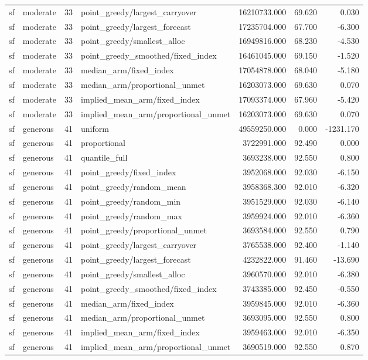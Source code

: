 \begin{tabular}{llrlrrr}
sf & moderate & 33 & point\_greedy/largest\_carryover & 16210733.000 & 69.620 & 0.030 \\
sf & moderate & 33 & point\_greedy/largest\_forecast & 17235704.000 & 67.700 & -6.300 \\
sf & moderate & 33 & point\_greedy/smallest\_alloc & 16949816.000 & 68.230 & -4.530 \\
sf & moderate & 33 & point\_greedy\_smoothed/fixed\_index & 16461045.000 & 69.150 & -1.520 \\
sf & moderate & 33 & median\_arm/fixed\_index & 17054878.000 & 68.040 & -5.180 \\
sf & moderate & 33 & median\_arm/proportional\_unmet & 16203073.000 & 69.630 & 0.070 \\
sf & moderate & 33 & implied\_mean\_arm/fixed\_index & 17093374.000 & 67.960 & -5.420 \\
sf & moderate & 33 & implied\_mean\_arm/proportional\_unmet & 16203073.000 & 69.630 & 0.070 \\
sf & generous & 41 & uniform & 49559250.000 & 0.000 & -1231.170 \\
sf & generous & 41 & proportional & 3722991.000 & 92.490 & 0.000 \\
sf & generous & 41 & quantile\_full & 3693238.000 & 92.550 & 0.800 \\
sf & generous & 41 & point\_greedy/fixed\_index & 3952068.000 & 92.030 & -6.150 \\
sf & generous & 41 & point\_greedy/random\_mean & 3958368.300 & 92.010 & -6.320 \\
sf & generous & 41 & point\_greedy/random\_min & 3951529.000 & 92.030 & -6.140 \\
sf & generous & 41 & point\_greedy/random\_max & 3959924.000 & 92.010 & -6.360 \\
sf & generous & 41 & point\_greedy/proportional\_unmet & 3693584.000 & 92.550 & 0.790 \\
sf & generous & 41 & point\_greedy/largest\_carryover & 3765538.000 & 92.400 & -1.140 \\
sf & generous & 41 & point\_greedy/largest\_forecast & 4232822.000 & 91.460 & -13.690 \\
sf & generous & 41 & point\_greedy/smallest\_alloc & 3960570.000 & 92.010 & -6.380 \\
sf & generous & 41 & point\_greedy\_smoothed/fixed\_index & 3743385.000 & 92.450 & -0.550 \\
sf & generous & 41 & median\_arm/fixed\_index & 3959845.000 & 92.010 & -6.360 \\
sf & generous & 41 & median\_arm/proportional\_unmet & 3693095.000 & 92.550 & 0.800 \\
sf & generous & 41 & implied\_mean\_arm/fixed\_index & 3959463.000 & 92.010 & -6.350 \\
sf & generous & 41 & implied\_mean\_arm/proportional\_unmet & 3690519.000 & 92.550 & 0.870 \\
\bottomrule
\end{tabular}
